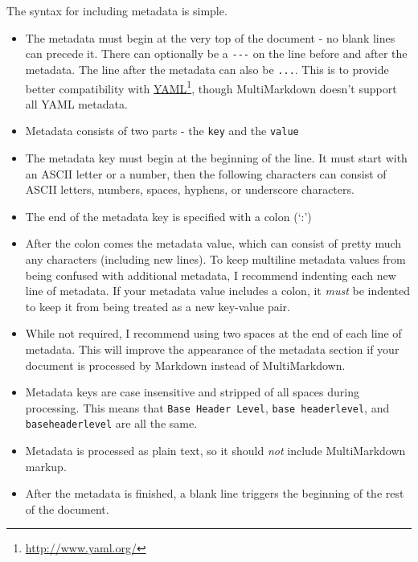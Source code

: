 The syntax for including metadata is simple.

\begin{itemize}
\item The metadata must begin at the very top of the document - no blank lines can precede it. There can optionally be a \texttt{-{}-{}-} on the line before and after the metadata. The line after the metadata can also be \texttt{...}. This is to provide better compatibility with \href{http://www.yaml.org/}{YAML}\footnote{\href{http://www.yaml.org/}{http:\slash{}\slash{}www.yaml.org\slash{}}}, though MultiMarkdown doesn't support all YAML metadata.

\item Metadata consists of two parts - the \texttt{key} and the \texttt{value}

\item The metadata key must begin at the beginning of the line. It must start with an ASCII letter or a number, then the following characters can consist of ASCII letters, numbers, spaces, hyphens, or underscore characters.

\item The end of the metadata key is specified with a colon (`:')

\item After the colon comes the metadata value, which can consist of pretty much any characters (including new lines). To keep multiline metadata values from being confused with additional metadata, I recommend indenting each new line of metadata. If your metadata value includes a colon, it \emph{must} be indented to keep it from being treated as a new key-value pair.

\item While not required, I recommend using two spaces at the end of each line of metadata. This will improve the appearance of the metadata section if your document is processed by Markdown instead of MultiMarkdown.

\item Metadata keys are case insensitive and stripped of all spaces during processing. This means that \texttt{Base Header Level}, \texttt{base headerlevel}, and \texttt{baseheaderlevel} are all the same.

\item Metadata is processed as plain text, so it should \emph{not} include MultiMarkdown markup.

\item After the metadata is finished, a blank line triggers the beginning of the rest of the document.

\end{itemize}

